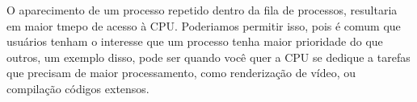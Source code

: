 \begin{question}

    O aparecimento de um processo repetido dentro da fila de processos,
    resultaria em maior tmepo de acesso à CPU. Poderiamos permitir isso, pois 
    é comum que usuários tenham o interesse que um processo tenha maior prioridade do que outros,
    um exemplo disso, pode ser quando você quer a CPU se dedique a tarefas que 
    precisam de maior processamento, como renderização de vídeo, ou compilação códigos 
    extensos.

\end{question}
